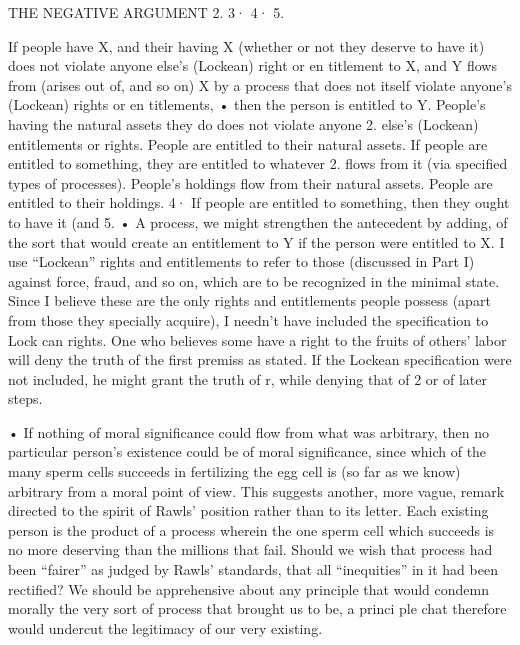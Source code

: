 \documentclass[11pt,openany]{book}
\begin{document}
{THE NEGATIVE ARGUMENT 2. 3· 4· 5.\par

If people have X, and their having X (whether or not they deserve to have it) does not violate anyone else's (Lockean) right or en titlement to X, and Y flows from (arises out of, and so on) X by a process that does not itself violate anyone's (Lockean) rights or en titlements, • then the person is entitled to Y. People's having the natural assets they do does not violate anyone 2. else's (Lockean) entitlements or rights. People are entitled to their natural assets. If people are entitled to something, they are entitled to whatever 2. flows from it (via specified types of processes). People's holdings flow from their natural assets. People are entitled to their holdings. 4· If people are entitled to something, then they ought to have it (and 5. • A process, we might strengthen the antecedent by adding, of the sort that would create an entitlement to Y if the person were entitled to X. I use ``Lockean'' rights and entitlements to refer to those (discussed in Part I) against force, fraud, and so on, which are to be recognized in the minimal state. Since I believe these are the only rights and entitlements people possess (apart from those they specially acquire), I needn't have included the specification to Lock can rights. One who believes some have a right to the fruits of others' labor will deny the truth of the first premiss as stated. If the Lockean specification were not included, he might grant the truth of r, while denying that of 2 or of later steps.\par

• If nothing of moral significance could flow from what was arbitrary, then no particular person's existence could be of moral significance, since which of the many sperm cells succeeds in fertilizing the egg cell is (so far as we know) arbitrary from a moral point of view. This suggests another, more vague, remark directed to the spirit of Rawls' position rather than to its letter. Each existing person is the product of a process wherein the one sperm cell which succeeds is no more deserving than the millions that fail. Should we wish that process had been ``fairer'' as judged by Rawls' standards, that all ``inequities'' in it had been rectified? We should be apprehensive about any principle that would condemn morally the very sort of process that brought us to be, a princi ple chat therefore would undercut the legitimacy of our very existing.\par

}
\end{document}
